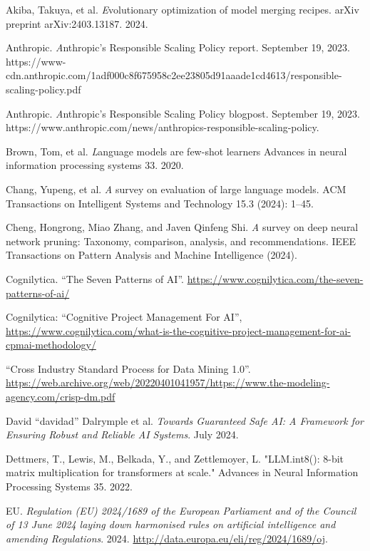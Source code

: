 \documentclass[twocolumn]{article}
\begin{document}
\small
\begin{thebibliography}{99}
 Akiba, Takuya, et al. {\emph Evolutionary optimization of model merging recipes}. arXiv preprint arXiv:2403.13187. 2024.

 Anthropic. {\emph Anthropic's Responsible Scaling Policy} report. September 19, 2023. https://www-cdn.anthropic.com/1adf000c8f675958c2ee23805d91aaade1cd4613/responsible-scaling-policy.pdf

 Anthropic. {\emph Anthropic's Responsible Scaling Policy} blogpost. September 19, 2023. https://www.anthropic.com/news/anthropics-responsible-scaling-policy.

 Brown, Tom, et al. {\emph Language models are few-shot learners} Advances in neural information processing systems 33. 2020.

 Chang, Yupeng, et al. {\emph A survey on evaluation of large language models}. ACM Transactions on Intelligent Systems and Technology 15.3 (2024): 1--45.

 Cheng, Hongrong, Miao Zhang, and Javen Qinfeng Shi. {\emph A survey on deep neural network pruning: Taxonomy, comparison, analysis, and recommendations}. IEEE Transactions on Pattern Analysis and Machine Intelligence (2024).
  
 Cognilytica. “The Seven Patterns of AI”. \url{https://www.cognilytica.com/the-seven-patterns-of-ai/}

 Cognilytica: “Cognitive Project Management For AI”, \url{https://www.cognilytica.com/what-is-the-cognitive-project-management-for-ai-cpmai-methodology/}

 “Cross Industry Standard Process for Data Mining 1.0”. \url{https://web.archive.org/web/20220401041957/https://www.the-modeling-agency.com/crisp-dm.pdf}

 David ``davidad'' Dalrymple et al. {\em Towards Guaranteed Safe AI: A Framework for Ensuring Robust and Reliable AI Systems}. July 2024.

 Dettmers, T., Lewis, M., Belkada, Y., and Zettlemoyer, L. "LLM.int8(): 8-bit matrix multiplication for transformers at scale." Advances in Neural Information Processing Systems 35. 2022.

 EU. {\em Regulation (EU) 2024/1689 of the European Parliament and of the Council of 13 June 2024 laying down harmonised rules on artificial intelligence and amending Regulations}. 2024. \url{http://data.europa.eu/eli/reg/2024/1689/oj}.
  

\end{thebibliography}
\end{document}
